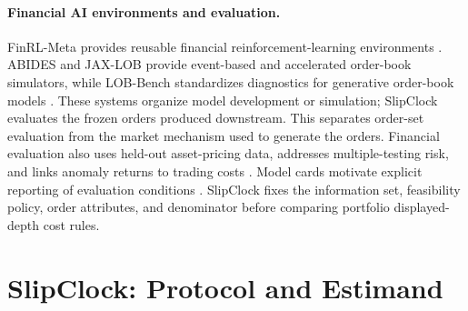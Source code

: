 \documentclass[sigconf]{acmart}
\begin{document}
\paragraph{Financial AI environments and evaluation.}
FinRL-Meta provides reusable financial reinforcement-learning environments \cite{liu2022finrlmeta}. ABIDES and JAX-LOB provide event-based and accelerated order-book simulators, while LOB-Bench standardizes diagnostics for generative order-book models \cite{byrd2020abides,frey2023jaxlob,nagy2025lobbench}. These systems organize model development or simulation; SlipClock evaluates the frozen orders produced downstream. This separates order-set evaluation from the market mechanism used to generate the orders. Financial evaluation also uses held-out asset-pricing data, addresses multiple-testing risk, and links anomaly returns to trading costs \cite{gu2020,harvey2016,novymarx2016}. Model cards motivate explicit reporting of evaluation conditions \cite{mitchell2019}. SlipClock fixes the information set, feasibility policy, order attributes, and denominator before comparing portfolio displayed-depth cost rules.

\section{SlipClock: Protocol and Estimand}
\end{document}
